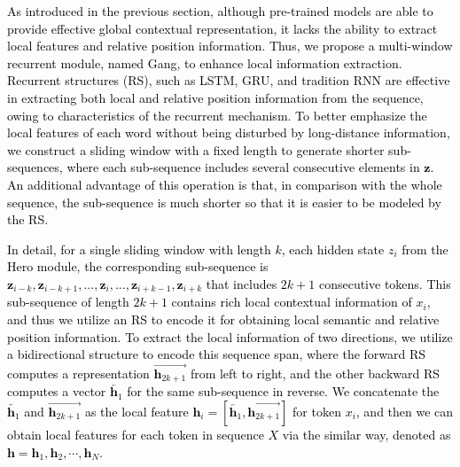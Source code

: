 \documentclass[11pt]{article}
\begin{document}
\textcolor{black}{As introduced in the previous section, although pre-trained models are able to provide effective global contextual representation, it lacks the ability to extract local features and relative position information.
\textcolor{black}{Thus, we propose a multi-window recurrent module, named Gang, to enhance local information extraction.}
Recurrent structures (RS), such as LSTM, GRU, and tradition RNN are effective in extracting both local and relative position information from the sequence, owing to characteristics of the recurrent mechanism.
To better emphasize the local features of each word without being disturbed by long-distance information, we construct a sliding window with a fixed length to generate shorter sub-sequences, where each sub-sequence includes several consecutive elements in $\mathbf{z}$.
An additional advantage of this operation is that, in comparison with the whole sequence, the sub-sequence is much shorter so that it is easier to be modeled by the RS.
}

\textcolor{black}{
In detail, for a single sliding window with length $k$, each hidden state $z_{i}$ from the Hero module, the corresponding sub-sequence is $\mathbf{z}_{i-k},\mathbf{z}_{i-k+1},...,\mathbf{z}_{i},...,\mathbf{z}_{i+k-1},\mathbf{z}_{i+k}$ that includes $2k+1$ consecutive tokens.
This sub-sequence of length $2k+1$ contains rich local contextual information of $x_{i}$, and thus we utilize an RS to encode it for obtaining local semantic and relative position information.
To extract the local information of two directions, we utilize a bidirectional structure to encode this sequence span, where the forward RS computes a representation $\overrightarrow{\mathbf{h}_{2k+1}}$ from left to right, and the other backward RS computes a vector $\overleftarrow{\mathbf{h}_{1}}$ for the same sub-sequence in reverse.}
\textcolor{black}{We concatenate the $\overleftarrow{\mathbf{h}_{1}}$ and $\overrightarrow{\mathbf{h}_{2k+1}}$ as the local feature $\mathbf{h}_{i} = [\overleftarrow{\mathbf{h}_{1}}, \overrightarrow{\mathbf{h}_{2k+1}} ]$ for token $x_{i}$, and then we can obtain local features for each token in sequence $X$ via the similar way, denoted as $\mathbf{h}=\mathbf{h}_{1},\mathbf{h}_{2},\cdots,\mathbf{h}_{N}$.}
\end{document}
